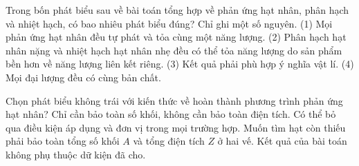 \begin{ex}
Trong bốn phát biểu sau về bài toán tổng hợp về phản ứng hạt nhân, phân hạch và nhiệt hạch, có bao nhiêu phát biểu đúng? Chỉ ghi một số nguyên. (1) Mọi phản ứng hạt nhân đều tự phát và tỏa cùng một năng lượng. (2) Phân hạch hạt nhân nặng và nhiệt hạch hạt nhân nhẹ đều có thể tỏa năng lượng do sản phẩm bền hơn về năng lượng liên kết riêng. (3) Kết quả phải phù hợp ý nghĩa vật lí. (4) Mọi đại lượng đều có cùng bản chất.
\end{ex}

\begin{ex}
Chọn phát biểu không trái với kiến thức về hoàn thành phương trình phản ứng hạt nhân?
\choice
{Chỉ cần bảo toàn số khối, không cần bảo toàn điện tích.}
{Có thể bỏ qua điều kiện áp dụng và đơn vị trong mọi trường hợp.}
{\True Muốn tìm hạt còn thiếu phải bảo toàn tổng số khối $A$ và tổng điện tích $Z$ ở hai vế.}
{Kết quả của bài toán không phụ thuộc dữ kiện đã cho.}
\end{ex}

